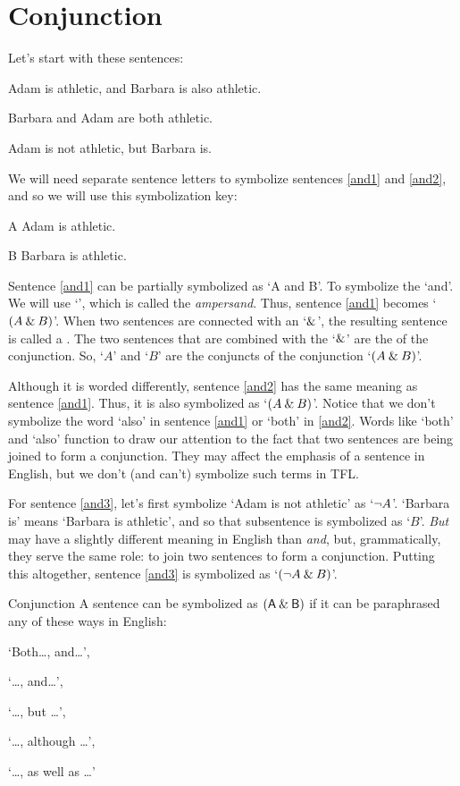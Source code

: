 \section{Conjunction}
\label{s:ConnectiveConjunction}

Let's start with these sentences:
	\begin{earg}
		\item[\ex{and1}] Adam is athletic, and Barbara is also athletic.
		\item[\ex{and2}] Barbara and Adam are both athletic.
		\item[\ex{and3}] Adam is not athletic, but Barbara is.
	\end{earg}
We will need separate sentence letters to symbolize sentences \ref{and1} and \ref{and2}, and so we will use this symbolization key:
	\begin{ekey}
		\item[A] Adam is athletic.
		\item[B] Barbara is athletic.
	\end{ekey}
Sentence \ref{and1} can be partially symbolized as `A and B'. To symbolize the `and'. We will use `\eand', which is called the \textit{ampersand}. Thus, sentence \ref{and1} becomes `$(A\mathbin{\&} B)$'. When two sentences are connected with an `$\mathbin{\&}$', the resulting sentence is called a . The two sentences that are combined with the `$\mathbin{\&}$' are the  of the conjunction. So, `$A$' and `$B$' are the conjuncts of the conjunction `$(A\mathbin{\&} B)$'.

Although it is worded differently, sentence \ref{and2} has the same meaning as sentence \ref{and1}. Thus, it is also symbolized as `$(A\mathbin{\&} B)$'.
Notice that we don't symbolize the word `also' in sentence \ref{and1} or `both' in \ref{and2}. Words like `both' and `also' function to draw our attention to the fact that two sentences are being joined to form a conjunction. They may affect the emphasis of a sentence in English, but we don't (and can't) symbolize such terms in TFL. 

For sentence \ref{and3}, let's first symbolize `Adam is not athletic' as `${\neg} A$'. `Barbara is' means `Barbara is athletic', and so that subsentence is symbolized as `$B$'. \textit{But} may have a slightly different meaning in English than \textit{and}, but, grammatically, they serve the same role: to join two sentences to form a conjunction. Putting this altogether, sentence \ref{and3} is symbolized as `$({\neg} A \mathbin{\&} B)$'.


\begin{factboxy}{Conjunction}
A sentence can be symbolized as $(\mathsf{A}\mathbin{\&}\mathsf{B})$ if it can be paraphrased any of these ways in English:
\vspace{-2mm}
\begin{earg}
\item[] `Both\ldots, and\ldots',
\item[] `\ldots, and\ldots',
\item[] `\ldots, but \ldots', 
\item[] `\ldots, although \ldots',
\item[] `\ldots, as well as \ldots'
\end{earg}
\end{factboxy}
	
